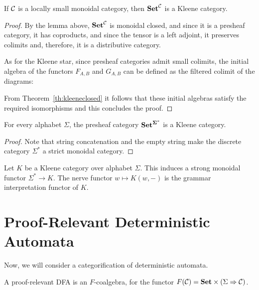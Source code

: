 \documentclass[acmsmall,anonymous,review,screen]{acmart}
\newcommand{\cat}[1]{
  \relax
  \StrLen{#1}[\arglength]
  \ifnum\arglength=1
  \mathcal{#1}
  \else
  \mathbf{#1}
  \fi
}
\newcommand{\Set}{\cat{Set}}
\newcommand{\grammar}{\Set^{\cat{\Sigma^*}}}
\begin{document}
\begin{theorem}
  If $\cat{C}$ is a locally small monoidal category, then
  $\Set^{\cat{C}}$ is a Kleene category.
\end{theorem}
\begin{proof}

  By the lemma above, $\Set^{\cat{C}}$ is monoidal closed, and since it
  is a presheaf category, it has coproducts, and since the tensor
  is a left adjoint, it preserves colimits and, therefore, it is
  a distributive category.

  As for the Kleene star, since presheaf categories admit small colimits,
  the initial algebra of the functors $F_{A,B}$ and $G_{A,B}$ can be
  defined as the filtered colimit of the diagrams:

  From Theorem~\ref{th:kleeneclosed} it follows that these initial
  algebras satisfy the required isomorphisms and this concludes the
  proof.
\end{proof}

\begin{corollary}
  For every alphabet $\Sigma$, the presheaf category $\grammar$
  is a Kleene category.
\end{corollary}
\begin{proof}
  Note that string concatenation and the empty string make the
  discrete category $\Sigma^*$ a strict monoidal category.
\end{proof}

\begin{definition}
  Let $K$ be a Kleene category over alphabet $\Sigma$. This
  induces a strong monoidal functor $\Sigma^* \to K$. The
  nerve functor $w \mapsto K(w, -)$ is the grammar interpretation
  functor of $K$.
\end{definition}

\section{Proof-Relevant Deterministic Automata}

Now, we will consider a categorification of deterministic automata.

\begin{definition}
  A proof-relevant DFA is an $F$-coalgebra, for the functor
  $F(\cat{C}) = \Set \times (\Sigma \Rightarrow \cat{C})$.
\end{definition}
\end{document}

